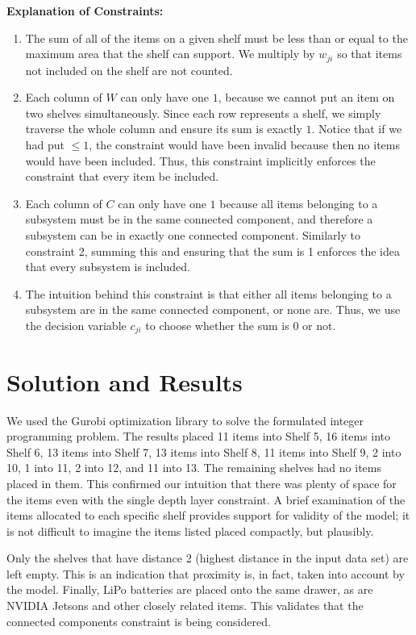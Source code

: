 \documentclass[10pt]{article}
\theoremstyle{named}
\begin{document}
\textbf{Explanation of Constraints:}
\begin{enumerate}
\item The sum of all of the items on a given shelf must be less than or equal to
  the maximum area that the shelf can support. We multiply by $w_{ji}$ so that
  items not included on the shelf are not counted.
\item Each column of $W$ can only have one $1$, because we cannot put an item
  on two shelves simultaneously. Since each row represents a shelf, we simply
  traverse the whole column and ensure its sum is exactly $1$. Notice that if
  we had put $\leq 1$, the constraint would have been invalid because then
  no items would have been included. Thus, this constraint implicitly enforces
  the constraint that every item be included.
\item Each column of $C$ can only have one $1$ because all items belonging to
  a subsystem must be in the same connected component, and therefore a subsystem
  can be in exactly one connected component. Similarly to constraint 2, summing
  this and ensuring that the sum is 1 enforces the idea that every subsystem is
  included.
\item The intuition behind this constraint is that either all items belonging
  to a subsystem are in the same connected component, or none are. Thus, we
  use the decision variable $c_{ji}$ to choose whether the sum is $0$ or not.
\end{enumerate}

\section{Solution and Results}
We used the Gurobi optimization library to solve the formulated integer programming
problem. The results placed 11 items into Shelf 5, 16 items into Shelf 6, 13 items
into Shelf 7, 13 items into Shelf 8, 11 items into Shelf 9, 2 into 10, 1 into 11,
2 into 12, and 11 into 13. The remaining shelves had no items placed in them.
This confirmed our intuition that there was plenty of space for the items
even with the single depth layer constraint. A brief examination of the items
allocated to each specific shelf provides support for validity of the model;
it is not difficult to imagine the items listed placed compactly, but plausibly.
\par
Only the shelves that have distance 2 (highest distance in the input data set)
are left empty. This is an indication that proximity is, in fact, taken into
account by the model. Finally, LiPo batteries are placed onto the same drawer,
as are NVIDIA Jetsons and other closely related items. This validates that the
connected components constraint is being considered.
\end{document}
